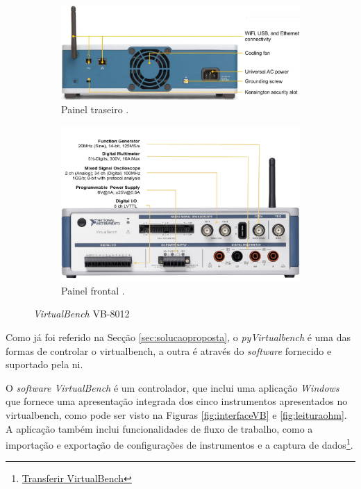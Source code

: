 \begin{figure}
     \centering
     \begin{subfigure}[b]{1\textwidth}
         \centering
         \includegraphics[width=\textwidth]{figures/virtualbench_back-panel.jpg}
         \caption{Painel traseiro  \cite{datasheetVirtualBench}.}
         \label{fig:paineltraseiro}
     \end{subfigure}
     \hfill
     \begin{subfigure}[b]{1\textwidth}
         \centering
         \includegraphics[width=\textwidth]{figures/virtualbench_front-panel.jpg}
         \caption{Painel frontal  \cite{datasheetVirtualBench}.}
         \label{fig:paineldianteiro}
     \end{subfigure}
     \hfill
    \caption{\textit{VirtualBench} VB-8012}
    \label{fig:VB8012}
\end{figure}

Como já foi referido na Secção \ref{sec:solucaoproposta}, o \textit{pyVirtualbench} é uma das formas de controlar o \acrshort{virtualbench}, a outra é através do \textit{software} fornecido e suportado pela \acrshort{ni}.

O \textit{software VirtualBench} é um controlador, que inclui uma aplicação \textit{Windows} que fornece uma apresentação integrada dos cinco instrumentos apresentados no \acrshort{virtualbench}, como pode ser visto na Figuras \ref{fig:interfaceVB} e \ref{fig:leituraohm}. A aplicação também inclui funcionalidades de fluxo de trabalho, como a importação e exportação de configurações de instrumentos e a captura de dados\footnote{\href{https://www.ni.com/en/support/downloads/drivers/download.virtualbench-software.html}{Transferir VirtualBench}}.

